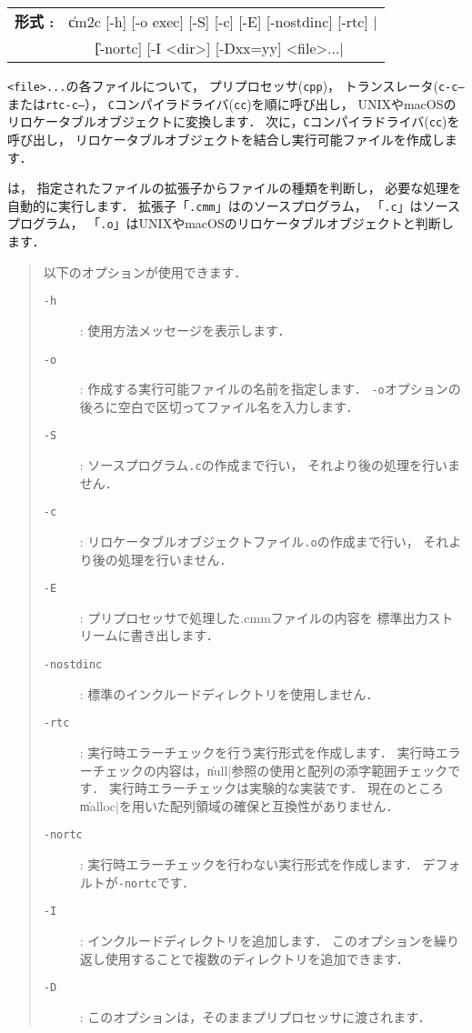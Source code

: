 \begin{flushleft}
\begin{tabular}{l l}
{\bf 形式 : } & \|cm2c [-h] [-o exec] [-S] [-c] [-E] [-nostdinc] [-rtc] | \\
              & ~~~ \| [-nortc] [-I <dir>] [-Dxx=yy] <file>...|
\end{tabular}
\end{flushleft}

{\tt <file>...}の各ファイルについて，
プリプロセッサ({\tt cpp})，
トランスレータ({\tt c-c--}または{\tt rtc-c--}），
{\tt C}コンパイラドライバ({\tt cc})を順に呼び出し，
UNIXやmacOSのリロケータブルオブジェクトに変換します．
次に，{\tt C}コンパイラドライバ({\tt cc})を呼び出し，
リロケータブルオブジェクトを結合し実行可能ファイルを作成します．

{\cmc}は，
指定されたファイルの拡張子からファイルの種類を判断し，
必要な処理を自動的に実行します．
拡張子「{\tt .cmm}」は{\cmml}のソースプログラム，
「{\tt .c}」は{\cl}ソースプログラム，
「{\tt .o}」はUNIXやmacOSのリロケータブルオブジェクトと判断します．

\begin{quote}
\hspace{-1em}以下のオプションが使用できます．

\begin{description}
\item[{\tt -h}] : 使用方法メッセージを表示します．
\item[{\tt -o}] : 作成する実行可能ファイルの名前を指定します．
{\tt -o}オプションの後ろに空白で区切ってファイル名を入力します．
\item[{\tt -S}] : {\cl}ソースプログラム{\tt .c}の作成まで行い，
  それより後の処理を行いません．
\item[{\tt -c}] : リロケータブルオブジェクトファイル{\tt .o}の作成まで行い，
  それより後の処理を行いません．
\item[{\tt -E}] : プリプロセッサで処理した{.cmm}ファイルの内容を
  標準出力ストリームに書き出します．
\item[{\tt -nostdinc}] : 標準のインクルードディレクトリを使用しません．
\item[{\tt -rtc}] : 実行時エラーチェックを行う実行形式を作成します．
  実行時エラーチェックの内容は，\|null|参照の使用と配列の添字範囲チェックです．
  実行時エラーチェックは実験的な実装です．
  現在のところ\|malloc|を用いた配列領域の確保と互換性がありません．
\item[{\tt -nortc}] : 実行時エラーチェックを行わない実行形式を作成します．
  デフォルトが{\tt -nortc}です．
\item[{\tt -I}] : インクルードディレクトリを追加します．
  このオプションを繰り返し使用することで複数のディレクトリを追加できます．
\item[{\tt -D}] : このオプションは，そのままプリプロセッサに渡されます．
\end{description}
\end{quote}

